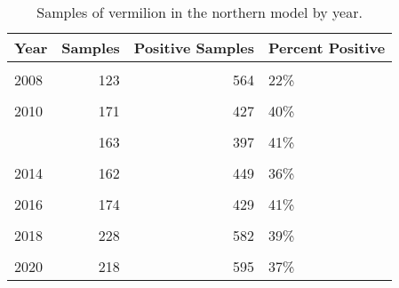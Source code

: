 \documentclass[
]{article}
\begin{document}
\begin{table}

\caption{\label{tab:tab-year-ccfrp}Samples of vermilion in the northern model by year.}
\centering
\begin{tabular}[t]{lrrl}
\toprule
Year & Samples & Positive Samples & Percent Positive\\
\midrule
\cellcolor{gray!6}{2007} & \cellcolor{gray!6}{96} & \cellcolor{gray!6}{552} & \cellcolor{gray!6}{17\%}\\
2008 & 123 & 564 & 22\%\\
\cellcolor{gray!6}{2009} & \cellcolor{gray!6}{115} & \cellcolor{gray!6}{371} & \cellcolor{gray!6}{31\%}\\
2010 & 171 & 427 & 40\%\\
\cellcolor{gray!6}{2011} & \cellcolor{gray!6}{142} & \cellcolor{gray!6}{374} & \cellcolor{gray!6}{38\%}\\
\addlinespace
2012 & 163 & 397 & 41\%\\
\cellcolor{gray!6}{2013} & \cellcolor{gray!6}{110} & \cellcolor{gray!6}{430} & \cellcolor{gray!6}{26\%}\\
2014 & 162 & 449 & 36\%\\
\cellcolor{gray!6}{2015} & \cellcolor{gray!6}{98} & \cellcolor{gray!6}{224} & \cellcolor{gray!6}{44\%}\\
2016 & 174 & 429 & 41\%\\
\addlinespace
\cellcolor{gray!6}{2017} & \cellcolor{gray!6}{190} & \cellcolor{gray!6}{516} & \cellcolor{gray!6}{37\%}\\
2018 & 228 & 582 & 39\%\\
\cellcolor{gray!6}{2019} & \cellcolor{gray!6}{260} & \cellcolor{gray!6}{622} & \cellcolor{gray!6}{42\%}\\
2020 & 218 & 595 & 37\%\\
\bottomrule
\end{tabular}
\end{table}

\FloatBarrier
\end{document}
